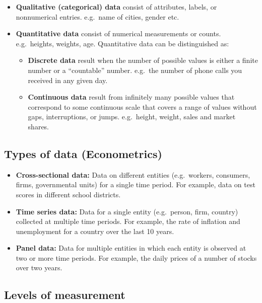 \documentclass[
]{article}
\begin{document}
\begin{itemize}
\item
  \textbf{Qualitative (categorical) data} consist of attributes, labels,
  or nonnumerical entries. e.g.~name of cities, gender etc.
\item
  \textbf{Quantitative data} consist of numerical measurements or
  counts. e.g.~heights, weights, age. Quantitative data can be
  distinguished as:

  \begin{itemize}
  \item
    \textbf{Discrete data} result when the number of possible values is
    either a finite number or a ``countable'' number. e.g.~the number of
    phone calls you received in any given day.
  \item
    \textbf{Continuous data} result from infinitely many possible values
    that correspond to some continuous scale that covers a range of
    values without gaps, interruptions, or jumps. e.g.~height, weight,
    sales and market shares.
  \end{itemize}
\end{itemize}

\hypertarget{types-of-data-econometrics}{%
\subsection{Types of data
(Econometrics)}\label{types-of-data-econometrics}}

\begin{itemize}
\item
  \textbf{Cross-sectional data:} Data on different entities
  (e.g.~workers, consumers, firms, governmental units) for a single time
  period. For example, data on test scores in different school
  districts.
\item
  \textbf{Time series data:} Data for a single entity (e.g.~person,
  firm, country) collected at multiple time periods. For example, the
  rate of inflation and unemployment for a country over the last 10
  years.
\item
  \textbf{Panel data:} Data for multiple entities in which each entity
  is observed at two or more time periods. For example, the daily prices
  of a number of stocks over two years.
\end{itemize}

\hypertarget{levels-of-measurement}{%
\subsection{Levels of measurement}\label{levels-of-measurement}}
\end{document}
